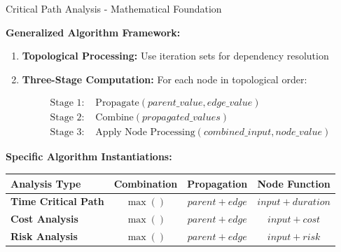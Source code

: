 \documentclass[aspectratio=169]{beamer}
\begin{document}
\begin{frame}{\textcolor{juliablue}{Critical Path Analysis - Mathematical Foundation}}

\textbf{Generalized Algorithm Framework:}
\begin{enumerate}
\item \textbf{Topological Processing:} Use iteration sets for dependency resolution
\item \textbf{Three-Stage Computation:} For each node in topological order:

\begin{align}
\text{Stage 1: } &\text{Propagate}(parent\_value, edge\_value) \\
\text{Stage 2: } &\text{Combine}(propagated\_values) \\
\text{Stage 3: } &\text{Apply Node Processing}(combined\_input, node\_value)
\end{align}
\end{enumerate}

\vspace{0.3cm}
\textbf{Specific Algorithm Instantiations:}

\begin{center}
\begin{tabular}{|l|c|c|c|}
\hline
\textbf{Analysis Type} & \textbf{Combination} & \textbf{Propagation} & \textbf{Node Function} \\
\hline
\textbf{Time Critical Path} & $\max()$ & $parent + edge$ & $input + duration$ \\
\hline
\textbf{Cost Analysis} & $\max()$ & $parent + edge$ & $input + cost$ \\
\hline
\textbf{Risk Analysis} & $\max()$ & $parent + edge$ & $input + risk$ \\
\hline
\end{tabular}
\end{center}

\end{frame}
\end{document}
